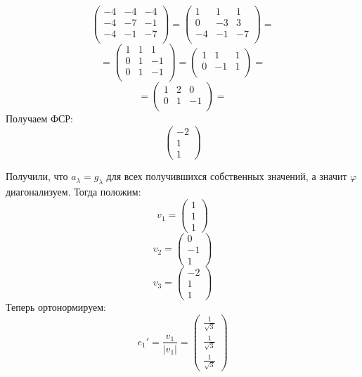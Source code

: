 \documentclass[a4paper,12pt]{article}
\begin{document}
\begin{itemize}
\[
\begin{pmatrix}
-4 & -4 & -4  \\
-4 & -7 & -1  \\
-4 & -1 & -7  \\
\end{pmatrix}
=
\begin{pmatrix}
1 & 1 & 1  \\
0 & -3 & 3  \\
-4 & -1 & -7  \\
\end{pmatrix}
=
\]
\[
=
\begin{pmatrix}
1 & 1 & 1  \\
0 & 1 & -1 \\
0 & 1 & -1 \\
\end{pmatrix}
=
\begin{pmatrix}
1 & 1 & 1 \\
0 & -1 & 1  \\
\end{pmatrix}
=
\]
\[
=
\begin{pmatrix}
1 & 2 & 0  \\
0 & 1 & -1  \\
\end{pmatrix}
=
\]
Получаем ФСР:
\[
\begin{pmatrix}
-2 \\ 1 \\ 1
\end{pmatrix}
\]
\end{itemize}
Получили, что $a_{\lambda} = g_{\lambda}$ для всех получившихся собственных значений, а значит $\varphi$ диагонализуем. Тогда положим:
\[
v_1 = 
\begin{pmatrix}
1 \\ 1 \\ 1
\end{pmatrix}
\]
\[
v_2 = 
\begin{pmatrix}
0 \\ -1 \\ 1
\end{pmatrix}
\]
\[
v_3 = 
\begin{pmatrix}
-2 \\ 1 \\ 1
\end{pmatrix}
\]
Теперь ортонормируем:
\[
e_1' = \frac{v_1}{|v_1|} = \begin{pmatrix}
\frac{1}{\sqrt{3}} \\ \frac{1}{\sqrt{3}} \\ \frac{1}{\sqrt{3}}
\end{pmatrix}
\]
\end{document}
